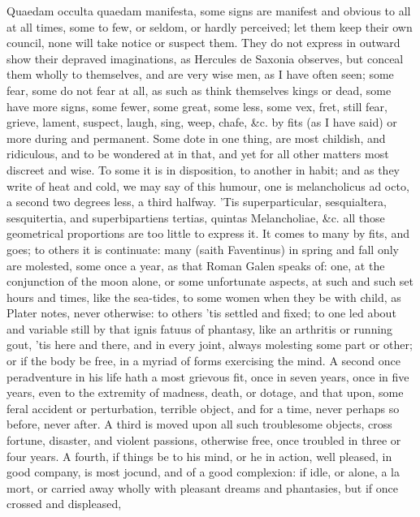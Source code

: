{Quaedam occulta quaedam manifesta, some signs are manifest and
obvious to all at all times, some to few, or seldom, or hardly
perceived; let them keep their own council, none will take notice or
suspect them. They do not express in outward show their depraved
imaginations, as Hercules de Saxonia observes, but conceal them
wholly to themselves, and are very wise men, as I have often seen; some
fear, some do not fear at all, as such as think themselves kings or
dead, some have more signs, some fewer, some great, some less, some
vex, fret, still fear, grieve, lament, suspect, laugh, sing, weep,
chafe, \&c. by fits (as I have said) or more during and permanent. Some
dote in one thing, are most childish, and ridiculous, and to be
wondered at in that, and yet for all other matters most discreet and
wise. To some it is in disposition, to another in habit; and as they
write of heat and cold, we may say of this humour, one is melancholicus
ad octo, a second two degrees less, a third halfway. 'Tis
superparticular, sesquialtera, sesquitertia, and superbipartiens
tertias, quintas Melancholiae, \&c. all those geometrical proportions
are too little to express it. It comes to many by fits, and goes;
to others it is continuate: many (saith Faventinus) in spring and
fall only are molested, some once a year, as that Roman  Galen
speaks of: one, at the conjunction of the moon alone, or some
unfortunate aspects, at such and such set hours and times, like the
sea-tides, to some women when they be with child, as Plater
notes, never otherwise: to others 'tis settled and fixed; to one led
about and variable still by that ignis fatuus of phantasy, like an
arthritis or running gout, 'tis here and there, and in every joint,
always molesting some part or other; or if the body be free, in a
myriad of forms exercising the mind. A second once peradventure in his
life hath a most grievous fit, once in seven years, once in five years,
even to the extremity of madness, death, or dotage, and that upon, some
feral accident or perturbation, terrible object, and for a time, never
perhaps so before, never after. A third is moved upon all such
troublesome objects, cross fortune, disaster, and violent passions,
otherwise free, once troubled in three or four years. A fourth, if
things be to his mind, or he in action, well pleased, in good company,
is most jocund, and of a good complexion: if idle, or alone, a la mort,
or carried away wholly with pleasant dreams and phantasies, but if once
crossed and displeased,

}
